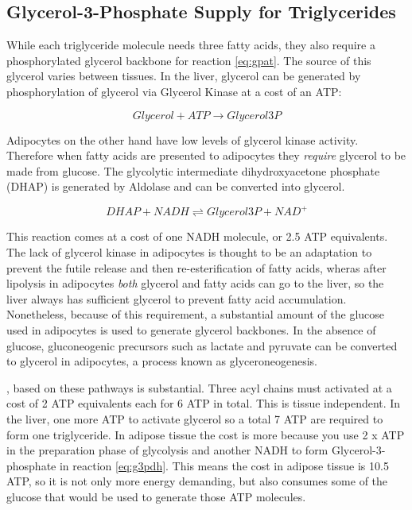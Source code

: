 \documentclass{tufte-handout}
\begin{document}
\subsection{Glycerol-3-Phosphate Supply for Triglycerides}

While each triglyceride molecule needs three fatty acids, they also require a phosphorylated glycerol backbone for reaction \ref{eq:gpat}.  The source of this glycerol varies between tissues.  In the liver, glycerol can be generated by phosphorylation of glycerol via Glycerol Kinase at a cost of an ATP:

\begin{equation}
Glycerol + ATP \rightarrow Glycerol3P
\end{equation}

Adipocytes on the other hand have low levels of glycerol kinase activity.  Therefore when fatty acids are presented to adipocytes they \emph{require} glycerol to be made from glucose.  The glycolytic intermediate dihydroxyacetone phosphate (DHAP) is generated by Aldolase and can be converted into glycerol.

\begin{equation}\label{eq:g3pdh}
DHAP + NADH \rightleftharpoons Glycerol3P + NAD^+
\end{equation}

This reaction comes at a cost of one NADH molecule, or 2.5 ATP equivalents.  The lack of glycerol kinase in adipocytes is thought to be an adaptation to prevent the futile release and then re-esterification of fatty acids, wheras after lipolysis in adipocytes \emph{both} glycerol and fatty acids can go to the liver, so the liver always has sufficient glycerol to prevent fatty acid accumulation.  Nonetheless, because of this requirement, a substantial amount of the glucose used in adipocytes is used to generate glycerol backbones.  In the absence of glucose, gluconeogenic precursors such as lactate and pyruvate can be converted to glycerol in adipocytes, a process known as glyceroneogenesis.

, based on these pathways is substantial.  Three acyl chains must activated at a cost of 2 ATP equivalents each for 6 ATP in total.  This is tissue independent. In the liver, one more ATP to activate glycerol so a total 7 ATP are required to form one triglyceride.  In adipose tissue the cost is more because you use 2 x ATP in the preparation phase of glycolysis and another NADH to form Glycerol-3-phosphate in reaction \ref{eq:g3pdh}.  This means the cost in adipose tissue is 10.5 ATP, so it is not only more energy demanding, but also consumes some of the glucose that would be used to generate those ATP molecules.
\end{document}
